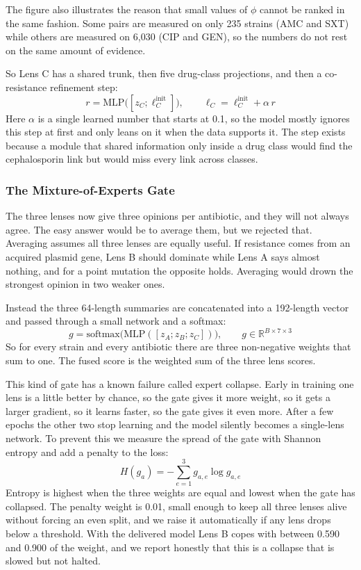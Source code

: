 \documentclass[conference]{IEEEtran}
\begin{document}
The figure also illustrates the reason that small values of $\phi$ cannot be ranked
in the same fashion. Some
pairs are measured on only 235 strains (AMC and SXT) while others are measured on
6{,}030 (CIP and GEN), so the numbers do not rest on the same amount of evidence.

So Lens C has a shared trunk, then five drug-class projections, and then a
co-resistance refinement step:
\begin{equation}
r = \mathrm{MLP}\big([z_C ; \ell_C^{\text{init}}]\big), \qquad
\ell_C = \ell_C^{\text{init}} + \alpha\, r
\end{equation}
Here $\alpha$ is a single learned number that starts at 0.1, so the model mostly
ignores this step at first and only leans on it when the data supports it. The step
exists because a module that shared information only inside a drug class would find
the cephalosporin link but would miss every link across classes.

\subsubsection{The Mixture-of-Experts Gate}

The three lenses now give three opinions per antibiotic, and they will not always
agree. The easy answer would be to average them, but we rejected that. Averaging
assumes all three lenses are equally useful. If resistance comes from an acquired
plasmid gene, Lens B should dominate while Lens A says almost nothing, and for a
point mutation the opposite holds. Averaging would drown the strongest opinion in
two weaker ones.

Instead the three 64-length summaries are concatenated into a 192-length vector and
passed through a small network and a softmax:
\begin{equation}
g = \mathrm{softmax}\big(\mathrm{MLP}([z_A; z_B; z_C])\big), \qquad g \in \mathbb{R}^{B \times 7 \times 3}
\end{equation}
So for every strain and every antibiotic there are three non-negative weights that
sum to one. The fused score is the weighted sum of the three lens scores.

This kind of gate has a known failure called expert collapse. Early in training one
lens is a little better by chance, so the gate gives it more weight, so it gets a
larger gradient, so it learns faster, so the gate gives it even more. After a few
epochs the other two stop learning and the model silently becomes a single-lens
network. To prevent this we measure the spread of the gate with Shannon entropy and
add a penalty to the loss:
\begin{equation}
H(g_a) = -\sum_{e=1}^{3} g_{a,e} \log g_{a,e}
\end{equation}
Entropy is highest when the three weights are equal and lowest when the gate has
collapsed. The penalty weight is 0.01, small enough to keep all three lenses alive
without forcing an even split, and we raise it automatically if any lens drops below
a threshold. With the delivered model Lens B copes with between 0.590 and 0.900 of the weight,
and we report honestly that this is a collapse that is slowed but not halted.
\end{document}
